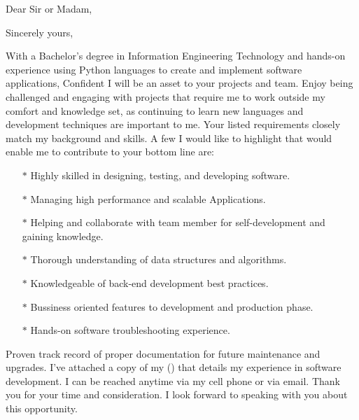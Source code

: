 \documentclass{subfiles}
\begin{document}
\clearpage
{} %
\date{\today} %
\opening{Dear Sir or Madam,} %
\closing{Sincerely yours,} %

\makelettertitle %
With a Bachelor’s degree in Information Engineering Technology and hands-on experience using Python languages to create and implement software applications, Confident I will be an asset to your projects and team.
\newline
Enjoy being challenged and engaging with projects that require me to work outside my comfort and knowledge set, as continuing to learn new languages and development techniques are important to me.
\newline
Your listed requirements closely match my background and skills. A few I would like to highlight that would enable me to contribute to your bottom line are:

\begin{itemize}
        \item[$\ast$] Highly skilled in designing, testing, and developing software.
        \item[$\ast$] Managing high performance and scalable Applications.
        \item[$\ast$] Helping and collaborate with team member for self-development and gaining knowledge.
        \item[$\ast$] Thorough understanding of data structures and algorithms.
        \item[$\ast$] Knowledgeable of back-end development best practices.
        \item[$\ast$] Bussiness oriented features to development and production phase.
        \item[$\ast$] Hands-on software troubleshooting experience.
\end{itemize}

Proven track record of proper documentation for future maintenance and upgrades.
I’ve attached a copy of my  () that details my experience in software development. I can be reached anytime via my cell phone or via email.
\newline
Thank you for your time and consideration. I look forward to speaking with you about this opportunity.

\makeletterclosing %

\newpage
\end{document}
